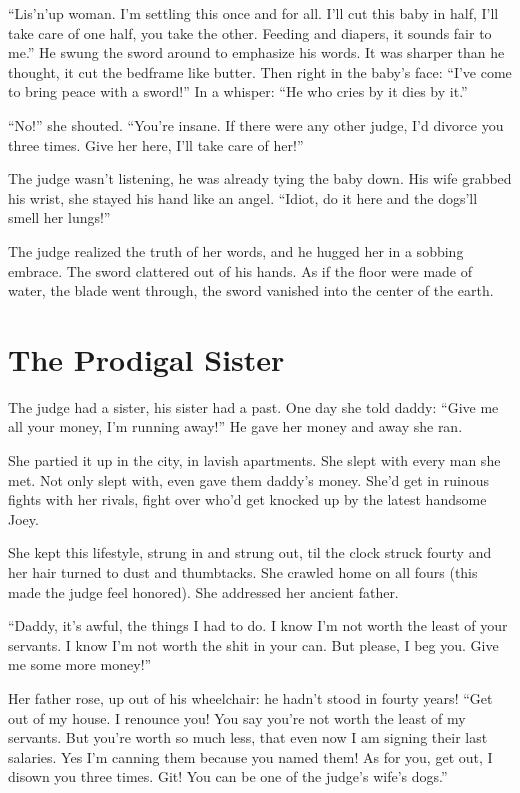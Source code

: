 \documentclass[oneside]{book}
\begin{document}
``Lis'n'up woman.  I'm settling this once and for all.
I'll cut this baby in half, I'll take care of one half, you take
the other.  Feeding and diapers, it sounds fair to me.''  He swung the sword around
to emphasize his words.  It was sharper than he thought, it cut the
bedframe like butter.  Then right in the baby's face:  ``I've come to bring
peace with a sword!''  In a whisper:  ``He who cries by it dies by it.''

``No!'' she shouted.  ``You're insane.  If there were any other judge,
I'd divorce you three times.  Give her here, I'll take care of her!''

The judge wasn't listening, he was already tying the baby down.
His wife grabbed his wrist, she stayed his hand like an angel.
``Idiot, do it here and the dogs'll smell her lungs!''

The judge realized the truth of her words, and he hugged her in a sobbing embrace.
The sword clattered out of his hands.  As if the floor were made of water, the blade went
through, the sword vanished into the center of the earth.



\chapter{The Prodigal Sister}


The judge had a sister, his sister had a past.
One day she told daddy:  ``Give me all your money,
I'm running away!''  He gave her money and away she ran.

She partied it up in the city, in lavish apartments.
She slept with every man she met.
Not only slept with, even gave them daddy's money.
She'd get in ruinous fights with her rivals, fight over
who'd get knocked up by the latest handsome Joey.

She kept this lifestyle, strung in and strung out,
til the clock struck fourty and her hair turned to dust and thumbtacks.
She crawled home on all fours (this made the judge feel honored).
She addressed
her ancient father.

``Daddy, it's awful, the things I had to do.
I know I'm not worth the least of your servants.
I know I'm not worth the shit in your can.
But please, I beg you.  Give me some more money!''

Her father rose, up out of his wheelchair:
he hadn't stood in fourty years!
``Get out of my house.  I renounce you!
You say you're not worth the least of my servants.
But you're worth so much less, that even now I am signing
their last salaries.  Yes I'm canning them because you named
them!
As for you, get out, I disown you three times.  Git!  You can be one of the judge's
wife's dogs.''
\end{document}

